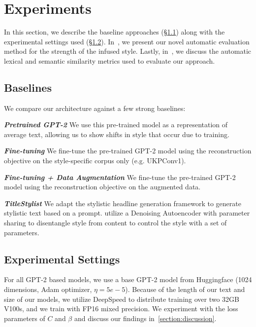 \section{Experiments}
\label{sec:si_experiments}

In this section, we describe the baseline approaches (\S\ref{subsec:si_baseline}) along with the experimental settings used (\S\ref{subsec:si_exp}). In~, we present our novel automatic evaluation method for the strength of the infused style. Lastly, in~, we discuss the automatic lexical and semantic similarity metrics used to evaluate our approach.

\subsection{Baselines}
\label{subsec:si_baseline}

We compare our architecture against a few strong baselines:

\textit{\textbf{Pretrained GPT-2}} \citep{radford2019language} We use this pre-trained model as a representation of average text, allowing us to show shifts in style that occur due to training.

\textit{\textbf{Fine-tuning}} We fine-tune the pre-trained GPT-2 model using the reconstruction objective on the style-specific corpus only (e.g. UKPConv1).

\textit{\textbf{Fine-tuning + Data Augmentation}}  We fine-tune the pre-trained GPT-2 model using the reconstruction objective on the augmented data.

\textit{\textbf{TitleStylist}} \citep{jin2020hooks} We adapt the stylistic headline generation framework to generate stylistic text based on a prompt. \citet{jin2020hooks} utilize a Denoising Autoencoder with parameter sharing to disentangle style from content to control the style with a set of parameters.  

\subsection{Experimental Settings}
\label{subsec:si_exp}
For all GPT-2 based models, we use a base GPT-2 model from Huggingface \citep{wolf2019} (1024 dimensions, Adam optimizer, $\eta = 5e-5$). Because of the length of our text and size of our models, we utilize DeepSpeed \citep{rasley-2020-deepspeed} to distribute training over two 32GB V100s, and we train with FP16 mixed precision. We experiment with the loss parameters of $C$ and $\beta$ and discuss our findings in~\cref{section:discussion}. 

